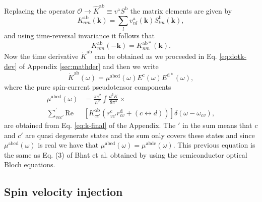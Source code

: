 \documentclass[prb,11pt,tightenlines,twocolumn,aps]{revtex4-1}
\begin{document}
Replacing the operator $\mathcal{O} \rightarrow \hat{K}^{\mathrm{ab}} \equiv v^
{\mathrm{a}} S^{\mathrm{b}}$ the matrix elements are given by
\begin{equation}
K^{\mathrm{ab}}_{nm}(\mathbf{k}) = 
\sum_{l} v^{\mathrm{a}}_{nl}(\mathbf{k})S^{\mathrm{b}}_{lm}(\mathbf{k}), 
\label{eq:velspimatelem}
\end{equation}
and using time-reversal invariance it follows that 
\begin{equation}
K^{\mathrm{ab}}_{nm}(\mathbf{-k}) = K^{\mathrm{ab*}}_{nm}(\mathbf{k}). 
\label{eq:k-timerev}
\end{equation}
Now the time derivative $\dot{K}^\mathrm{ab}$ can be obtained as we proceeded
in Eq. \eqref{eq:dotk-dev} of Appendix \ref{sec:mathder} and then we write
\begin{equation}
\dot{K}^{\mathrm{ab}}(\omega) =
\mu^{\mathrm{abcd}}(\omega)
E^{\mathrm{c}}(\omega) E^{\mathrm{d*}}(\omega),
\label{eq:dotk}
\end{equation}
where the pure spin-current pseudotensor components
\begin{equation}\label{eq:mu}
\begin{aligned}
\mu^{\mathrm{abcd}}  (\omega) &
=
\frac{\pi e^{2}}{\hbar^{2}} \int 
\frac{d^{3}K}{8 \pi^{3}} \times \\
\sum_{vcc'}^{'}
\mathrm{Re} & \left[ K^{\mathrm{ab}}_{cc'} 
\left( 
r^{\mathrm{c}}_{vc'} 
r^{\mathrm{d}}_{cv } +
(c \leftrightarrow d)
\right) 
\right] \delta(\omega-\omega_{cv}),
\end{aligned}
\end{equation}
are obtained from Eq. \eqref{eq:k-final} of the Appendix.
% 
The $'$ in the sum means that $c$ and $c'$ are quasi degenerate states and the
sum only covers these states and since $\mu^{\mathrm{abcd}}(\omega)$ is real we
have that $\mu^{\mathrm{abcd}}(\omega) = \mu^{\mathrm{abdc}}(\omega)$. This
previous equation is the same as Eq. (3) of Bhat et al.\cite{bhatPRL05}
obtained by using the semiconductor optical Bloch equations.




\subsection{Spin velocity injection} %
\label{sec:theory-pure_spin_current}
\end{document}
